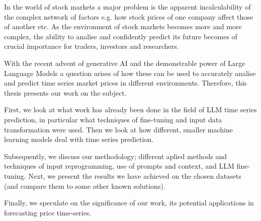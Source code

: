 In the world of stock markets a major problem is the apparent incalculability of the complex network of factors e.g. how stock prices of one company affect those of another etc. As the environment of stock markets becomes more and more complex, the ability to analise and confidently predict its future becomes of crucial importance for traders, investors and researchers. 

With the recent advent of generative AI and the demonstrable power of Large Language Models a question arises of how these can be used to accurately analise and predict time series market prices in different environments. Therefore, this thesis presents our work on the subject.

First, we look at what work has already been done in the field of LLM time series prediction, in particular what techniques of fine-tuning and input data transformation were used. Then we look at how different, smaller machine learning models deal with time series prediction.

Subsequently, we discuss our methodology; different aplied methods and techniques of input reprogramming, use of prompts and context, and LLM fine-tuning. Next, we present the results we have achieved on the chosen datasets (and compare them to some other known solutions).

Finally, we speculate on the significance of our work, its potential applications in forecasting price time-series.
